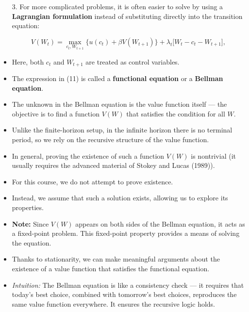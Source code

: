 \documentclass[12pt]{article}
\begin{document}
\begin{itemize}
    \item[3.] For more complicated problems, it is often easier to solve by using a \textbf{Lagrangian formulation} instead of substituting directly into the transition equation:

    \[
    V(W_t) = \max_{c_t, W_{t+1}} \Big\{ u(c_t) + \beta V(W_{t+1}) \Big\} + \lambda_t \Big[ W_t - c_t - W_{t+1} \Big],
    \]

    \item Here, both \( c_t \) and \( W_{t+1} \) are treated as control variables.

    \item The expression in (11) is called a \textbf{functional equation} or a \textbf{Bellman equation}.

    \item The unknown in the Bellman equation is the value function itself — the objective is to find a function \( V(W) \) that satisfies the condition for all \( W \).

    \item Unlike the finite-horizon setup, in the infinite horizon there is no terminal period, so we rely on the recursive structure of the value function.

    \item In general, proving the existence of such a function \( V(W) \) is nontrivial (it usually requires the advanced material of Stokey and Lucas (1989)).

    \item For this course, we do not attempt to prove existence.

    \item Instead, we assume that such a solution exists, allowing us to explore its properties.

    \item \textbf{Note:} Since \( V(W) \) appears on both sides of the Bellman equation, it acts as a fixed-point problem. This fixed-point property provides a means of solving the equation.

    \item Thanks to stationarity, we can make meaningful arguments about the existence of a value function that satisfies the functional equation.

    \item \textit{Intuition:} The Bellman equation is like a consistency check — it requires that today’s best choice, combined with tomorrow’s best choices, reproduces the same value function everywhere. It ensures the recursive logic holds.
\end{itemize}
\end{document}

